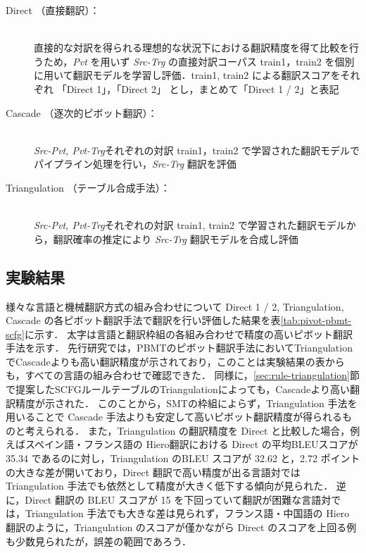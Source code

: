 \documentclass[japanese]{jnlp_1.4}
\newcommand{\asis}[1]{}
\begin{document}
\begin{description}
\item[Direct （直接翻訳）：]\mbox{}\\
直接的な対訳を得られる理想的な状況下における翻訳精度を得て比較を行うため，\textit{Pvt} を用いず \textit{Src-Trg} の直接対訳コーパス train1，train2 を個別に用いて翻訳モデルを学習し評価．train1, train2 による翻訳スコアをそれぞれ 「Direct 1」，「Direct 2」 とし，まとめて「Direct 1 / 2」と表記
\item[Cascade （逐次的ピボット翻訳）：]\mbox{}\\
\textit{Src-Pvt, Pvt-Trg}それぞれの対訳 train1，train2 で学習された翻訳モデルでパイプライン処理を行い，\textit{Src-Trg} 翻訳を評価
\item[Triangulation （テーブル合成手法）：]\mbox{}\\
\textit{Src-Pvt, Pvt-Trg}それぞれの対訳 train1, train2 で学習された翻訳モデルから，翻訳確率の推定により \textit{Src-Trg} 翻訳モデルを合成し評価
\end{description}

\asis{
コーパス中の中国語文は単語分割が行われていない状態であったため，KyTea \cite{neubig11-kytea} の中国語モデルを用いて単語分割を行った．
PBMTモデルの構築にはMoses \cite{koehn07moses}，SCFG翻訳モデルの構築にはTravatar \cite{neubig13travatar}のHiero学習ツールを利用した．
すべての翻訳システムでは KenLM \cite{heafield11} と train1+train2 の目的言語側20万文を用いて学習した 5-gram 言語モデルを訳出の自然性評価に用いている．
また，翻訳結果の評価には，自動評価尺度 BLEU \cite{papineni02} を用い，各SMTシステムについて MERT \cite{och03mert}により，開発用データセットに対して BLEU スコアが最大となるようにパラメータ調整を行った．
}


\subsection{実験結果}
\label{sec:pivot-result}

様々な言語と機械翻訳方式の組み合わせについて Direct 1 / 2, Triangulation, Cascade の各ピボット翻訳手法で翻訳を行い評価した結果を表\ref{tab:pivot-pbmt-scfg}に示す．
太字は言語と翻訳枠組の各組み合わせで精度の高いピボット翻訳手法を示す．
先行研究では，PBMTのピボット翻訳手法においてTriangulationでCascadeよりも高い翻訳精度が示されており，このことは実験結果の表からも，すべての言語の組み合わせで確認できた．
同様に，\ref{sec:rule-triangulation}節で提案したSCFGルールテーブルのTriangulationによっても，Cascadeより高い翻訳精度が示された．
このことから，SMTの枠組によらず，Triangulation 手法を用いることで Cascade 手法よりも安定して高いピボット翻訳精度が得られるものと考えられる．
また，Triangulation の翻訳精度を Direct と比較した場合，例えばスペイン語・フランス語の Hiero翻訳における Direct の平均BLEUスコアが 35.34 であるのに対し，Triangulation のBLEU スコアが 32.62 と，2.72 ポイントの大きな差が開いており，Direct 翻訳で高い精度が出る言語対では Triangulation 手法でも依然として精度が大きく低下する傾向が見られた．
逆に，Direct 翻訳の BLEU スコアが 15 を下回っていて翻訳が困難な言語対では，Triangulation 手法でも大きな差は見られず，フランス語・中国語の Hiero 翻訳のように，Triangulation のスコアが僅かながら Direct のスコアを上回る例も少数見られたが，誤差の範囲であろう．
\end{document}
